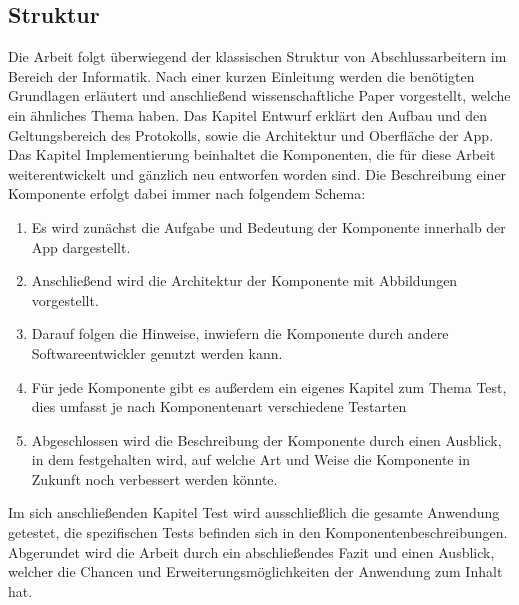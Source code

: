 \subsection{Struktur}
Die Arbeit folgt überwiegend der klassischen Struktur von Abschlussarbeitern im Bereich der Informatik. Nach einer kurzen Einleitung werden die benötigten Grundlagen erläutert und anschließend wissenschaftliche Paper vorgestellt, welche ein ähnliches Thema haben. Das Kapitel Entwurf erklärt den Aufbau und den Geltungsbereich des Protokolls, sowie die Architektur und Oberfläche der App. Das Kapitel Implementierung beinhaltet die Komponenten, die für diese Arbeit weiterentwickelt und gänzlich neu entworfen worden sind. Die Beschreibung einer Komponente erfolgt dabei immer nach folgendem Schema:
\begin{enumerate}
	\item Es wird zunächst die Aufgabe und Bedeutung der Komponente innerhalb der App dargestellt.
	\item Anschließend wird die Architektur der Komponente mit Abbildungen vorgestellt.
	\item Darauf folgen die Hinweise, inwiefern die Komponente durch andere Softwareentwickler genutzt werden kann.
	\item Für jede Komponente gibt es außerdem ein eigenes Kapitel zum Thema Test, dies umfasst je nach Komponentenart verschiedene Testarten
	\item Abgeschlossen wird die Beschreibung der Komponente durch einen Ausblick, in dem festgehalten wird, auf welche Art und Weise die Komponente in Zukunft noch verbessert werden könnte.
\end{enumerate}
Im sich anschließenden Kapitel Test wird ausschließlich die gesamte Anwendung getestet, die spezifischen Tests befinden sich in den Komponentenbeschreibungen. 
\newline Abgerundet wird die Arbeit durch ein abschließendes Fazit und einen Ausblick, welcher die Chancen und Erweiterungsmöglichkeiten der Anwendung zum Inhalt hat.
\newpage


